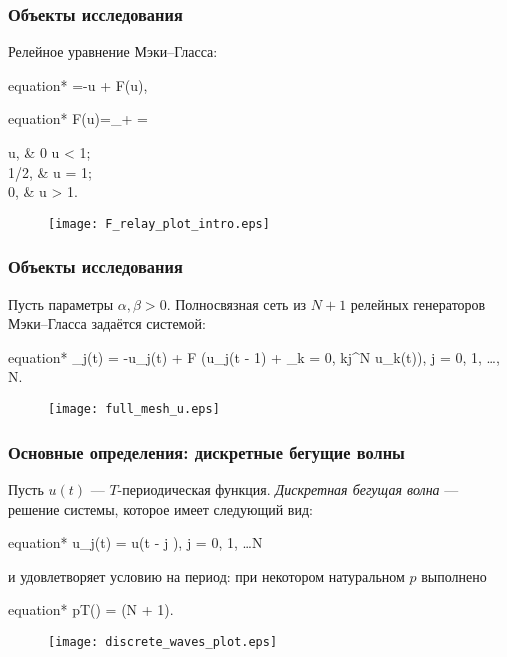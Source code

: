 \begin{frame}
	\frametitle{Объекты исследования}
	
	Релейное уравнение Мэки--Гласса:
	
	\begin{empheq}[box=\myeq]{equation*}
		=-\beta u + \alpha F(u),
	\end{empheq}
	
	\begin{empheq}[box=\myeq]{equation*}
		 F(u)=\lim\limits_{\gamma\to +\infty} = 
		\begin{cases}
			u, & 0 \leqslant u < 1;\\
			1/2, & u = 1;\\
			0, & u > 1.
		\end{cases}
	\end{empheq}
	
	\begin{figure}[ht]
		\centering
		\texttt{[image: F\_relay\_plot\_intro.eps]}
	\end{figure}
\end{frame}

\begin{frame}
	\frametitle{Объекты исследования}
	
	Пусть параметры $\alpha, \beta > 0$. Полносвязная сеть из $N + 1$ релейных генераторов Мэки--Гласса задаётся системой:
	
	\small
	\begin{empheq}[box=\myeq]{equation*}
		_j(t) = -\beta u_j(t) + \alpha F \bigg(u_j(t - 1) + \sum\limits_{k = 0, k\neq j}^N u_k(t)\bigg), \quad j = 0, 1, \dots, N.
	\end{empheq}
	\normalsize
	
	\begin{figure}
		\centering
		\texttt{[image: full\_mesh\_u.eps]}
	\end{figure}
	
 \end{frame}

\begin{frame}
	\frametitle{Основные определения: дискретные бегущие волны}
	
	Пусть $u(t)$ --- $T$-периодическая функция. \emph{Дискретная бегущая волна} --- решение системы, которое имеет следующий вид:
	\begin{empheq}[box=\myeq]{equation*}
		u_j(t) = u(t - j \Delta), \quad j = 0, 1, \dots N
	\end{empheq}
	
	и удовлетворяет условию на период: при некотором натуральном $p$ выполнено
	\begin{empheq}[box=\myeq]{equation*}
		pT(\Delta) = \Delta (N + 1).
	\end{empheq}
	
	\begin{figure}
		\centering
		\texttt{[image: discrete\_waves\_plot.eps]}
	\end{figure}
\end{frame}

